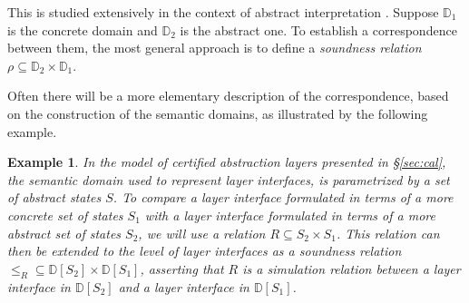 \documentclass[draft,11pt]{report}
\newtheorem{example}[theorem]{Example}
\theoremstyle{definition}
\begin{document}
This is studied extensively
in the context of abstract interpretation \citep{aif}.
Suppose $\mathbb{D}_1$ is the concrete domain
and $\mathbb{D}_2$ is the abstract one.
To establish a correspondence between them,
the most general approach is to define a \emph{soundness relation}
$\rho \subseteq \mathbb{D}_2 \times \mathbb{D}_1$.
%
%

Often there will be a more elementary description
of the correspondence,
based on the construction of the semantic domains,
as illustrated by the following example.

\begin{example}
In the model of \emph{certified abstraction layers}
presented in \S\ref{sec:cal},
the semantic domain used to represent layer interfaces,
is parametrized by a set of abstract states $S$.
To compare a layer interface formulated in terms of
a more concrete set of states $S_1$ with
a layer interface formulated in terms of
a more abstract set of states $S_2$,
we will use a relation $R \subseteq S_2 \times S_1$.
This relation can then be extended to the level of layer interfaces
as a soundness relation
${\le_R} \subseteq \mathbb{D}[S_2] \times \mathbb{D}[S_1]$,
asserting that $R$ is a simulation relation between
a layer interface in $\mathbb{D}[S_2]$ and
a layer interface in $\mathbb{D}[S_1]$.
\end{example}
\end{document}
